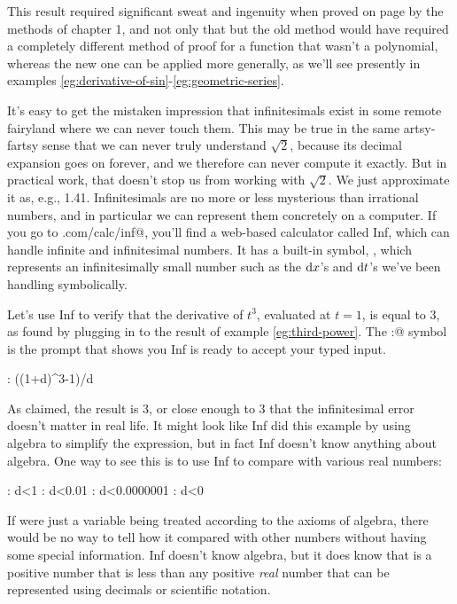 This result
required significant sweat and ingenuity when proved on page \pageref{detour:polynomial-proof} by the methods of chapter 1,
and not only that but the old method would have required a completely different method of proof for a function that
wasn't a polynomial, whereas the new one can be applied more generally, as we'll see presently in examples
\ref{eg:derivative-of-sin}-\ref{eg:geometric-series}.

It's easy to get the mistaken impression that infinitesimals exist in some remote fairyland where we can never
touch them. This may be true in the same artsy-fartsy sense that we can never truly understand $\sqrt{2}$, because
its decimal expansion goes on forever, and we therefore can never compute it exactly. But in practical work,
that doesn't stop us from working with $\sqrt{2}$. We just approximate it as, e.g., 1.41. Infinitesimals
are no more or less mysterious than irrational numbers, and in particular we can represent them concretely on a computer.
If you go to \verb@lightandmatter.com/calc/inf@, you'll find a web-based calculator called Inf,
which can handle infinite and infinitesimal numbers. It has a built-in symbol, \verb@d@, which represents an infinitesimally
small number such as the $\textup{d} x$'s and $\textup{d} t$'s we've been handling symbolically.

Let's use Inf to verify that the derivative of $t^3$, evaluated at $t=1$, is equal to 3, as found by plugging in to
the result of example \ref{eg:third-power}. The \verb@:@ symbol is the prompt that shows you Inf is ready to accept
your typed input.

\begin{Code}
  \ii : ((1+d)^3-1)/d
\end{Code}

As claimed, the result is 3, or close enough to 3 that the infinitesimal error doesn't matter in real life.
It might look like Inf did this example by using algebra to simplify the expression, but in fact Inf doesn't
know anything about algebra. One way to see this is to use Inf to compare \verb@d@ with various real numbers:

\begin{Code}
  \ii : d<1
  \ii : d<0.01
  \ii : d<0.0000001
  \ii : d<0
\end{Code}

If \verb@d@ were just a variable being treated according to the axioms of algebra, there would be no way
to tell how it compared with other numbers without having some special information. Inf doesn't know
algebra, but it does know that \verb@d@ is a positive number that is less than any positive \emph{real} number
that can be represented using decimals or scientific notation.

